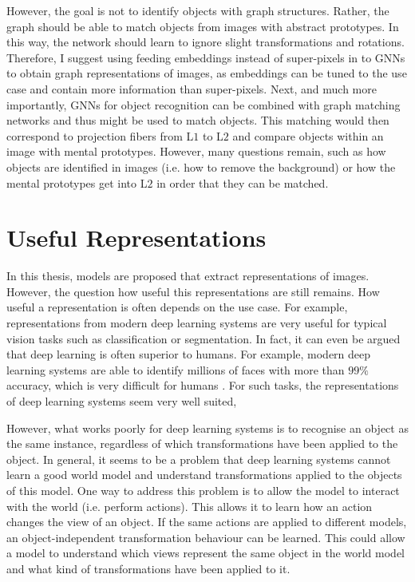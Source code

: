 However, the goal is not to identify objects with graph structures. Rather, the graph should be able to match objects from images with abstract prototypes. In this way, the network should learn to ignore slight transformations and rotations. Therefore, I suggest using feeding embeddings instead of super-pixels in to GNNs to obtain graph representations of images, as embeddings can be tuned to the use case and contain more information than super-pixels. Next, and much more importantly, GNNs for object recognition can be combined with graph matching networks  and thus might be used to match objects. This matching would then correspond to projection fibers from L$1$ to L$2$ and compare objects within an image with mental prototypes. However, many questions remain, such as how objects are identified in images (i.e. how to remove the background) or how the mental prototypes get into L$2$ in order that they can be matched.



\section{Useful Representations}
In this thesis, models are proposed that extract representations of images.
However, the question how useful this representations are still remains.
How useful a representation is often depends on the use case. For example, representations from modern deep learning systems are very useful for typical vision tasks such as classification or segmentation. In fact, it can even be argued that deep learning is often superior to humans. For example, modern deep learning systems  are able to identify millions of faces with more than $99\%$ accuracy, which is very difficult for humans . For such tasks, the representations of deep learning systems seem very well suited, 

However, what works poorly for deep learning systems is to recognise an object as the same instance, regardless of which transformations have been applied to the object. In general, it seems to be a problem that deep learning systems cannot learn a good world model and understand transformations applied to the objects of this model. One way to address this problem is to allow the model to interact with the world (i.e. perform actions). This allows it to learn how an action changes the view of an object. If the same actions are applied to different models, an object-independent transformation behaviour can be learned. This could allow a model to understand which views represent the same object in the world model and what kind of transformations have been applied to it.

